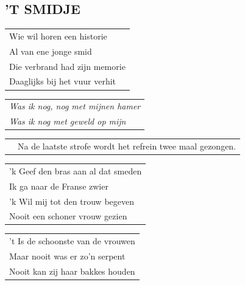 \documentclass[a4paper, 14pt]{extarticle}
\begin{document}
\subsection*{'T SMIDJE}
\begin{flushleft}
\begin{tabularx}{0.8\textwidth} {
   >{\raggedright\arraybackslash}X}  Wie wil horen een historie\\
Al van ene jonge smid\\
Die verbrand had zijn memorie\\
Daaglijks bij het vuur verhit\\
\end{tabularx}
\end{flushleft}\begin{flushleft}
\begin{tabularx}{0.8\textwidth} {
   >{\raggedright\arraybackslash}X}
\textit{Was ik nog, nog met mijnen hamer}\\
\textit{Was ik nog met geweld op mijn} \\
\end{tabularx}
\end{flushleft}\begin{flushleft}
\begin{tabularx}{0.8\textwidth} {
    c >{\raggedright\arraybackslash}X}
\hspace{5mm} & {\small Na de laatste strofe wordt het refrein twee maal gezongen.}\\
\end{tabularx}
\end{flushleft}\begin{flushleft}
\begin{tabularx}{0.8\textwidth} {
   >{\raggedright\arraybackslash}X}
’k Geef den bras aan al dat smeden\\
Ik ga naar de Franse zwier\\
’k Wil mij tot den trouw begeven\\
Nooit een schoner vrouw gezien\\
\end{tabularx}
\end{flushleft}\begin{flushleft}
\begin{tabularx}{0.8\textwidth} {
   >{\raggedright\arraybackslash}X}
’t Is de schoonste van de vrouwen\\
Maar nooit was er zo’n serpent\\
Nooit kan zij haar bakkes houden\\

\end{tabularx}
\end{flushleft}
\end{document}

